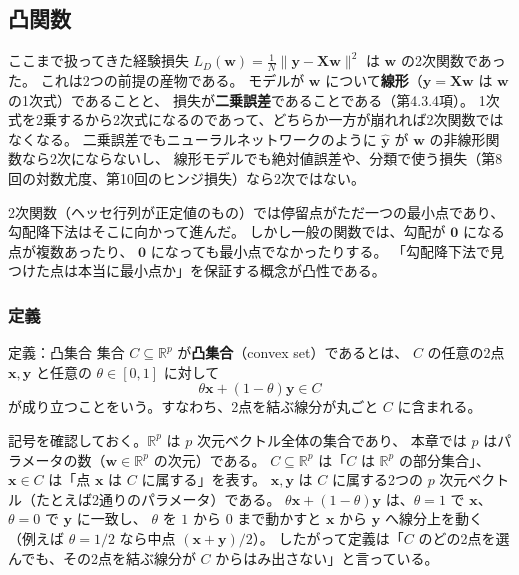\subsection{凸関数}

ここまで扱ってきた経験損失 $L_D(\bm{w}) = \frac{1}{N}\|\bm{y} - \bm{X}\bm{w}\|^2$ は $\bm{w}$ の2次関数であった。
これは2つの前提の産物である。
モデルが $\bm{w}$ について\textbf{線形}（$\hat{\bm{y}} = \bm{X}\bm{w}$ は $\bm{w}$ の1次式）であることと、
損失が\textbf{二乗誤差}であることである（第4.3.4項）。
1次式を2乗するから2次式になるのであって、どちらか一方が崩れれば2次関数ではなくなる。
二乗誤差でもニューラルネットワークのように $\hat{\bm{y}}$ が $\bm{w}$ の非線形関数なら2次にならないし、
線形モデルでも絶対値誤差や、分類で使う損失（第8回の対数尤度、第10回のヒンジ損失）なら2次ではない。

2次関数（ヘッセ行列が正定値のもの）では停留点がただ一つの最小点であり、勾配降下法はそこに向かって進んだ。
しかし一般の関数では、勾配が $\bm{0}$ になる点が複数あったり、
$\bm{0}$ になっても最小点でなかったりする。
「勾配降下法で見つけた点は本当に最小点か」を保証する概念が凸性である。

\subsubsection{定義}

\begin{itembox}[l]{定義：凸集合}
集合 $C \subseteq \mathbb{R}^p$ が\textbf{凸集合}（convex set）であるとは、
$C$ の任意の2点 $\bm{x}, \bm{y}$ と任意の $\theta \in [0, 1]$ に対して
\begin{equation}
  \theta\bm{x} + (1 - \theta)\bm{y} \in C
\end{equation}
が成り立つことをいう。すなわち、2点を結ぶ線分が丸ごと $C$ に含まれる。
\end{itembox}

記号を確認しておく。$\mathbb{R}^p$ は $p$ 次元ベクトル全体の集合であり、
本章では $p$ はパラメータの数（$\bm{w} \in \mathbb{R}^p$ の次元）である。
$C \subseteq \mathbb{R}^p$ は「$C$ は $\mathbb{R}^p$ の部分集合」、$\bm{x} \in C$ は「点 $\bm{x}$ は $C$ に属する」を表す。
$\bm{x}, \bm{y}$ は $C$ に属する2つの $p$ 次元ベクトル（たとえば2通りのパラメータ）である。
$\theta\bm{x} + (1 - \theta)\bm{y}$ は、$\theta = 1$ で $\bm{x}$、$\theta = 0$ で $\bm{y}$ に一致し、
$\theta$ を $1$ から $0$ まで動かすと $\bm{x}$ から $\bm{y}$ へ線分上を動く
（例えば $\theta = 1/2$ なら中点 $(\bm{x} + \bm{y})/2$）。
したがって定義は「$C$ のどの2点を選んでも、その2点を結ぶ線分が $C$ からはみ出さない」と言っている。


